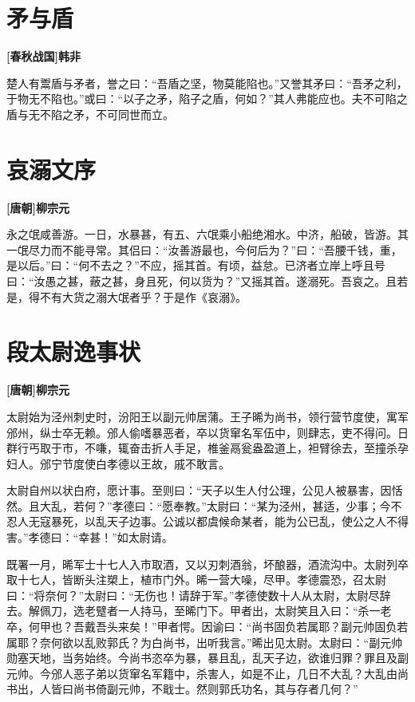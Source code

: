 \documentclass[UTF8,titlepage,oneside]{ctexbook}
\begin{document}
\chapter*{矛与盾}
\begin{center}
	\textbf{[春秋战国]韩非}
\end{center}

楚人有鬻盾与矛者，誉之曰：“吾盾之坚，物莫能陷也。”又誉其矛曰：“吾矛之利，于物无不陷也。”或曰：“以子之矛，陷子之盾，何如？”其人弗能应也。夫不可陷之盾与无不陷之矛，不可同世而立。


\chapter*{哀溺文序}
\begin{center}
	\textbf{[唐朝]柳宗元}
\end{center}

永之氓咸善游。一日，水暴甚，有五、六氓乘小船绝湘水。中济，船破，皆游。其一氓尽力而不能寻常。其侣曰：“汝善游最也，今何后为？”曰：“吾腰千钱，重，是以后。”曰：“何不去之？”不应，摇其首。有顷，益怠。已济者立岸上呼且号曰：“汝愚之甚，蔽之甚，身且死，何以货为？”又摇其首。遂溺死。吾哀之。且若是，得不有大货之溺大氓者乎？于是作《哀溺》。


\chapter*{段太尉逸事状}
\begin{center}
	\textbf{[唐朝]柳宗元}
\end{center}

太尉始为泾州刺史时，汾阳王以副元帅居蒲。王子晞为尚书，领行营节度使，寓军邠州，纵士卒无赖。邠人偷嗜暴恶者，卒以货窜名军伍中，则肆志，吏不得问。日群行丐取于市，不嗛，辄奋击折人手足，椎釜鬲瓮盎盈道上，袒臂徐去，至撞杀孕妇人。邠宁节度使白孝德以王故，戚不敢言。

太尉自州以状白府，愿计事。至则曰：“天子以生人付公理，公见人被暴害，因恬然。且大乱，若何？”孝德曰：“愿奉教。”太尉曰：“某为泾州，甚适，少事；今不忍人无寇暴死，以乱天子边事。公诚以都虞候命某者，能为公已乱，使公之人不得害。”孝德曰：“幸甚！”如太尉请。

既署一月，晞军士十七人入市取酒，又以刃刺酒翁，坏酿器，酒流沟中。太尉列卒取十七人，皆断头注槊上，植市门外。晞一营大噪，尽甲。孝德震恐，召太尉曰：“将奈何？”太尉曰：“无伤也！请辞于军。”孝德使数十人从太尉，太尉尽辞去。解佩刀，选老躄者一人持马，至晞门下。甲者出，太尉笑且入曰：“杀一老卒，何甲也？吾戴吾头来矣！”甲者愕。因谕曰：“尚书固负若属耶？副元帅固负若属耶？奈何欲以乱败郭氏？为白尚书，出听我言。”晞出见太尉。太尉曰：“副元帅勋塞天地，当务始终。今尚书恣卒为暴，暴且乱，乱天子边，欲谁归罪？罪且及副元帅。今邠人恶子弟以货窜名军籍中，杀害人，如是不止，几日不大乱？大乱由尚书出，人皆曰尚书倚副元帅，不戢士。然则郭氏功名，其与存者几何？”
\end{document}
